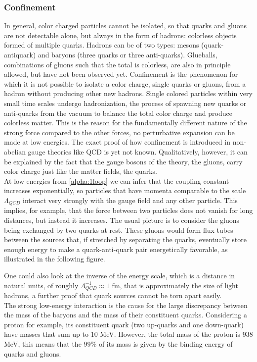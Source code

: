 \subsubsection{Confinement}
In general, color charged particles cannot be isolated, so that quarks and gluons are not detectable alone, but always in the form of hadrons: colorless objects formed of multiple quarks. Hadrons can be of two types: mesons (quark-antiquark) and baryons (three quarks or three anti-quarks). Glueballs, combinations of gluons such that the total is colorless, are also in principle allowed, but have not been observed yet. Confinement is the phenomenon for which it is not possible to isolate a color charge, single quarks or gluons, from a hadron without producing other new hadrons. Single colored particles within very small time scales undergo hadronization, the process of spawning new quarks or anti-quarks from the vacuum to balance the total color charge and produce colorless matter. This is the reason for the fundamentally different nature of the strong force compared to the other forces, no perturbative expansion can be made at low energies. The exact proof of how confinement is introduced in non-abelian gauge theories like QCD is yet not known. Qualitatively, however, it can be explained by the fact that the gauge bosons of the theory, the gluons, carry color charge just like the matter fields, the quarks. \\
At low energies from \cref{alpha:1loop} we can infer that the coupling constant increases exponentially, so particles that have momenta comparable to the scale $\Lambda_{QCD}$ interact very strongly with the gauge field and any other particle. This implies, for example, that the force between two particles does not vanish for long distances, but instead it increases. The usual picture is to consider the gluons being exchanged by two quarks at rest. These gluons would form flux-tubes between the sources that, if stretched by separating the quarks, eventually store enough energy to make a quark-anti-quark pair energetically favorable, as illustrated in the following figure. 

One could also look at the inverse of the energy scale, which is a distance in natural units, of roughly $\Lambda_{QCD}^{-1} \approx 1 $ fm, that is approximately the size of light hadrons, a further proof that quark sources cannot be torn apart easily.\\
The strong low-energy interaction is the cause for the large discrepancy between the mass of the baryons and the mass of their constituent quarks. Considering a proton for example, its constituent quark (two up-quarks and one down-quark) have masses that sum up to $10$ MeV. However, the total mass of the proton is $938$ MeV, this means that the $99\%$ of its mass is given by the binding energy of quarks and gluons.

